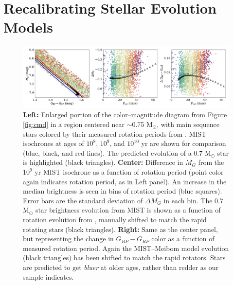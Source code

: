 \documentclass[preprint2]{aastex62}
\begin{document}
\section{Recalibrating Stellar Evolution Models}


\begin{figure}
\centering
\includegraphics[width=7in]{../figures/cmd_zoom}
\caption{
{\bf Left:} Enlarged portion of the color--magnitude diagram from Figure \ref{fig:cmd} in a region centered near $\sim$0.75 M$_\odot$, with main sequence stars colored by their measured rotation periods from \citet{mcquillan2014}.
MIST isochrones at ages of $10^8$, $10^9$, and $10^{10}$ yr are shown for comparison (blue, black, and red lines). The predicted evolution of a 0.7 M$_\odot$ star is highlighted (black triangles). 
{\bf Center:} Difference in $M_G$ from the $10^9$ yr MIST isochrone as a function of rotation period (point color again indicates rotation period, as in Left panel). An increase in the median brightness is seen in bins of rotation period (blue squares). Error bars are the standard deviation of $\Delta M_G$ in each bin. The 0.7 M$_\odot$ star brightness evolution from MIST is shown as a function of rotation evolution from \citet{meibom2009}, manually shifted to match the rapid rotating stars (black triangles).
{\bf Right:} Same as the center panel, but representing the change in $G_{BP}-G_{RP}$ color as a function of measured rotation period. Again the MIST--Meibom model evolution (black triangles) has been shifted to match the rapid rotators. Stars are predicted to get {\it bluer} at older ages, rather than redder as our sample indicates.
}
\label{fig:cmd_zoom}
\end{figure}
\end{document}
